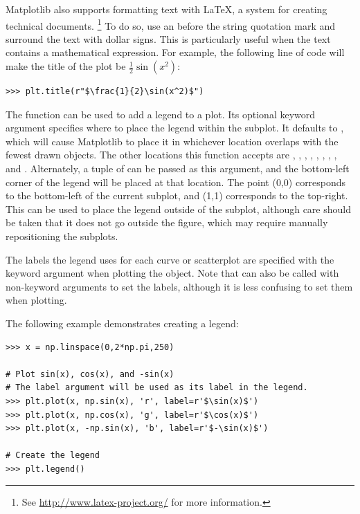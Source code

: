 Matplotlib also supports formatting text with \LaTeX, a system for creating technical documents.%
\footnote{See \url{http://www.latex-project.org/} for more information.}
To do so, use an  before the string quotation mark and surround the text with dollar signs.
This is particularly useful when the text contains a mathematical expression.
For example, the following line of code will make the title of the plot be $\frac{1}{2}\sin(x^2)$:
\begin{lstlisting}
>>> plt.title(r"$\frac{1}{2}\sin(x^2)$")
\end{lstlisting}

The function  can be used to add a legend to a plot.
Its optional  keyword argument specifies where to place the legend within the subplot.
It defaults to , which will cause Matplotlib to place it in whichever location overlaps with the fewest drawn objects.
The other locations this function accepts are , , , , , , , , and .
Alternately, a tuple of  can be passed as this argument, and the bottom-left corner of the legend will be placed at that location.
The point (0,0) corresponds to the bottom-left of the current subplot, and (1,1) corresponds to the top-right.
This can be used to place the legend outside of the subplot, although care should be taken that it does not go outside the figure, which may require manually repositioning the subplots.

The labels the legend uses for each curve or scatterplot are specified with the  keyword argument when plotting the object.
Note that  can also be called with non-keyword arguments to set the labels, although it is less confusing to set them when plotting.

The following example demonstrates creating a legend:
\begin{lstlisting}
>>> x = np.linspace(0,2*np.pi,250)

# Plot sin(x), cos(x), and -sin(x)
# The label argument will be used as its label in the legend.
>>> plt.plot(x, np.sin(x), 'r', label=r'$\sin(x)$')
>>> plt.plot(x, np.cos(x), 'g', label=r'$\cos(x)$')
>>> plt.plot(x, -np.sin(x), 'b', label=r'$-\sin(x)$')

# Create the legend
>>> plt.legend()
\end{lstlisting}

